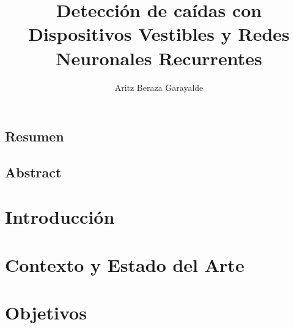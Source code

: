 \documentclass[11pt,a4paper,spanish]{book}
\title{Detección de caídas con Dispositivos Vestibles y Redes Neuronales Recurrentes}
\author{Aritz Beraza Garayalde}
\date{\currenttime}
\begin{document}



\renewcommand{\listfigurename}{Índice de Ilustraciones}
\renewcommand{\listtablename}{Índice de Tablas}
\renewcommand{\contentsname}{Índice de Contenidos}
\renewcommand{\figurename}{Figura}
\renewcommand{\tablename}{Tabla}

\maketitle
\frontmatter
\tableofcontents
\listoffigures
\listoftables

\mainmatter

\section*{Resumen}
%



\section*{Abstract}
%


\chapter{Introducción}\label{chap:intro}


\chapter{Contexto y Estado del Arte}\label{chap:stateofart}


\chapter{Objetivos}\label{chap:objetivos}

\end{document}
